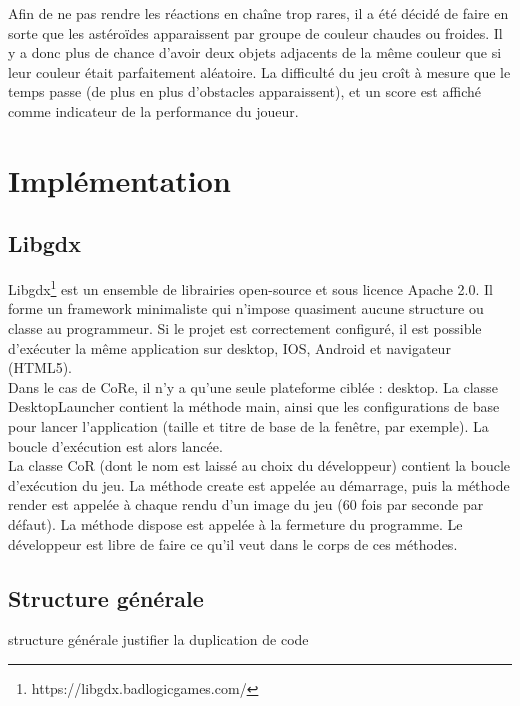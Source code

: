 \documentclass[11pt,a4paper,twoside,svgnames]{article}
\begin{document}
Afin de ne pas rendre les réactions en chaîne trop rares, il a été décidé de faire en sorte que les astéroïdes apparaissent par groupe de couleur chaudes ou froides. Il y a donc plus de chance d'avoir deux objets adjacents de la même couleur que si leur couleur était parfaitement aléatoire. La difficulté du jeu croît à mesure que le temps passe (de plus en plus d'obstacles apparaissent), et un score est affiché comme indicateur de la performance du joueur.

\section{Implémentation}
\subsection{Libgdx}
Libgdx\footnote{https://libgdx.badlogicgames.com/} est un ensemble de librairies open-source et sous licence Apache 2.0. Il forme un framework minimaliste qui n'impose quasiment aucune structure ou classe au programmeur. Si le projet est correctement configuré, il est possible d'exécuter la même application sur desktop, IOS, Android et navigateur (HTML5).\\

Dans le cas de CoRe, il n'y a qu'une seule plateforme ciblée : desktop. La classe DesktopLauncher contient la méthode main, ainsi que les configurations de base pour lancer l'application (taille et titre de base de la fenêtre, par exemple). La boucle d'exécution est alors lancée.\\

La classe CoR (dont le nom est laissé au choix du développeur) contient la boucle d'exécution du jeu. La méthode create est appelée au démarrage, puis la méthode render est appelée à chaque rendu d'un image du jeu (60 fois par seconde par défaut). La méthode dispose est appelée à la fermeture du programme. Le développeur est libre de faire ce qu'il veut dans le corps de ces méthodes.

\subsection{Structure générale}
structure générale
justifier la duplication de code

\clearpage
\end{document}
